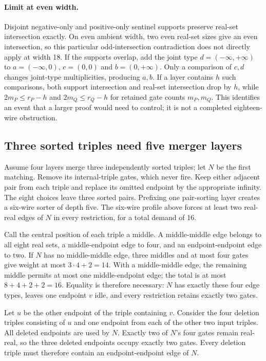 \documentclass[11pt]{article}
\begin{document}
\paragraph{Limit at even width.}
Disjoint negative-only and positive-only sentinel supports preserve real-set intersection exactly. On even ambient width, two even real-set sizes give an even intersection, so this particular odd-intersection contradiction does not directly apply at width 18. If the supports overlap, add the joint type $d=(-\infty,+\infty)$ to $a=(-\infty,0)$, $c=(0,0)$ and $b=(0,+\infty)$. Only a comparison of $c,d$ changes joint-type multiplicities, producing $a,b$. If a layer contains $h$ such comparisons, both support intersection and real-set intersection drop by $h$, while $2m_P\le r_P-h$ and $2m_Q\le r_Q-h$ for retained gate counts $m_P,m_Q$. This identifies an event that a larger proof would need to control; it is not a completed eighteen-wire obstruction.

\subsection{Three sorted triples need five merger layers}
Assume four layers merge three independently sorted triples; let $N$ be the first matching. Remove its internal-triple gates, which never fire. Keep either adjacent pair from each triple and replace its omitted endpoint by the appropriate infinity. The eight choices leave three sorted pairs. Prefixing one pair-sorting layer creates a six-wire sorter of depth five. The six-wire profile above forces at least two real-real edges of $N$ in every restriction, for a total demand of 16.

Call the central position of each triple a middle. A middle-middle edge belongs to all eight real sets, a middle-endpoint edge to four, and an endpoint-endpoint edge to two. If $N$ has no middle-middle edge, three middles and at most four gates give weight at most $3\cdot4+2=14$. With a middle-middle edge, the remaining middle permits at most one middle-endpoint edge; the total is at most $8+4+2+2=16$. Equality is therefore necessary: $N$ has exactly these four edge types, leaves one endpoint $v$ idle, and every restriction retains exactly two gates.

Let $u$ be the other endpoint of the triple containing $v$. Consider the four deletion triples consisting of $u$ and one endpoint from each of the other two input triples. All deleted endpoints are used by $N$. Exactly two of $N$'s four gates remain real-real, so the three deleted endpoints occupy exactly two gates. Every deletion triple must therefore contain an endpoint-endpoint edge of $N$.
\end{document}
